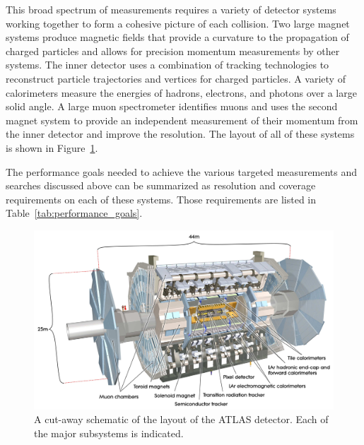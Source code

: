 This broad spectrum of measurements requires a variety of detector systems working together to form a cohesive picture of each collision. 
Two large magnet systems produce magnetic fields that provide a curvature to the propagation of charged particles and allows for precision momentum measurements by other systems.
The inner detector uses a combination of tracking technologies to reconstruct particle trajectories and vertices for charged particles.
A variety of calorimeters measure the energies of hadrons, electrons, and photons over a large solid angle.
A large muon spectrometer identifies muons and uses the second magnet system to provide an independent measurement of their momentum from the inner detector and improve the resolution. 
The layout of all of these systems is shown in Figure~\ref{fig:atlas_overview}.


The performance goals needed to achieve the various targeted measurements and searches discussed above can be summarized as resolution and coverage requirements on each of these systems.
Those requirements are listed in Table~\ref{tab:performance_goals}.

\begin{figure}[hbtp]
\includegraphics[width=\fullfig]{figures/atlas_overview.pdf}
\caption{A cut-away schematic of the layout of the ATLAS detector. Each of the major subsystems is indicated.}
\label{fig:atlas_overview}
\end{figure}

